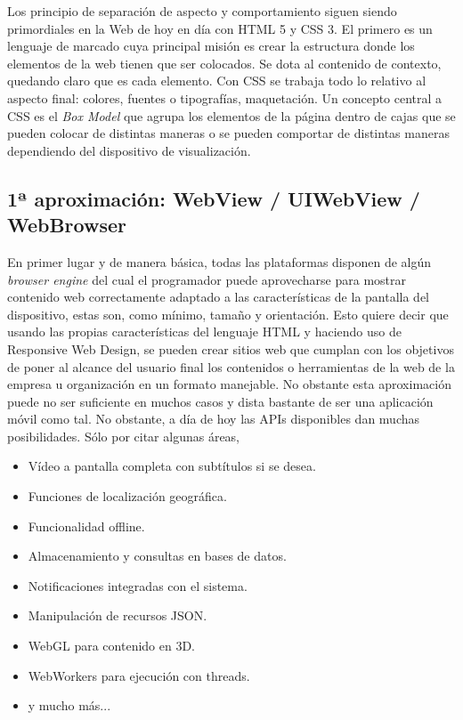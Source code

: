 \documentclass[
10pt, %
a4paper, %
oneside, %
headinclude,footinclude, %
BCOR5mm, %
]{scrartcl}
\begin{document}
Los principio de separación de aspecto y comportamiento siguen siendo primordiales en la Web de hoy en día con HTML 5 y CSS 3. El primero es un lenguaje de marcado cuya principal misión es crear la estructura donde los elementos de la web tienen que ser colocados. Se dota al contenido de contexto, quedando claro que es cada elemento. Con CSS se trabaja todo lo relativo al aspecto final: colores, fuentes o tipografías, maquetación. Un concepto central a CSS es el \textit{Box Model} que agrupa los elementos de la página dentro de cajas que se pueden colocar de distintas maneras o se pueden comportar de distintas maneras dependiendo del dispositivo de visualización.

\subsection{1ª aproximación: WebView / UIWebView / WebBrowser}
En primer lugar y de manera básica, todas las plataformas disponen de algún \textit{browser engine} del cual el programador puede aprovecharse para mostrar contenido web correctamente adaptado a las características de la pantalla del dispositivo, estas son, como mínimo, tamaño y orientación. Esto quiere decir que usando las propias características del lenguaje HTML y haciendo uso de Responsive Web Design, se pueden crear sitios web que cumplan con los objetivos de poner al alcance del usuario final los contenidos o herramientas de la web de la empresa u organización en un formato manejable. No obstante esta aproximación puede no ser suficiente en muchos casos y dista bastante de ser una aplicación móvil como tal. No obstante, a día de hoy las APIs disponibles dan muchas posibilidades. Sólo por citar algunas áreas, 

\begin{itemize}[noitemsep]
\item Vídeo a pantalla completa con subtítulos si se desea.
\item Funciones de localización geográfica.
\item Funcionalidad offline.
\item Almacenamiento y consultas en bases de datos.
\item Notificaciones integradas con el sistema.
\item Manipulación de recursos JSON.
\item WebGL para contenido en 3D.
\item WebWorkers para ejecución con threads.
\item y mucho más... \cite{mozilla_developer_network_web_2016}
\end{itemize}
\end{document}
